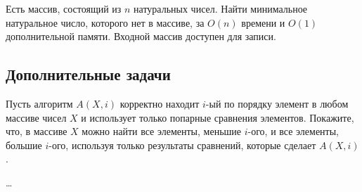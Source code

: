 \begin{problem}
    Есть массив, состоящий из $n$ натуральных чисел. Найти минимальное натуральное число,
    которого нет в массиве, за $O(n)$ времени и $O(1)$ дополнительной памяти.
    Входной массив доступен для записи.
\end{problem}

\begin{solution}
    \medskip\noindent
    
\end{solution}


\subsection*{Дополнительные задачи}

\begin{problem}
    Пусть алгоритм $A(X, i)$ корректно находит $i$-ый по порядку элемент
    в любом массиве чисел $X$ и использует только попарные сравнения элементов.
    Покажите, что, в массиве $X$ можно найти все элементы, меньшие $i$-ого,
    и все элементы, большие $i$-ого, используя только результаты сравнений,
    которые сделает $A(X, i)$.
\end{problem}

\begin{solution}
    \dots
\end{solution}


\clearpage
